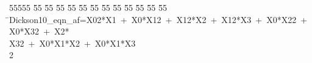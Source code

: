 %
%
\begin{tabbing}
55555 \= 55 \= 55 \= 55 \= 55 \= 55 \= 55 \= 55 \= 55 \= 55 \= 55 \= 55 \= 55 \= \>Dickson10\_eqn\_af=X02*X1\ +\ X0*X12\ +\ X12*X2\ +\ X12*X3\ +\ X0*X22\ +\ X0*X32\ +\ X2*\\[0pt]
\>X32\ +\ X0*X1*X2\ +\ X0*X1*X3\\[0pt]
2\>\end{tabbing}

